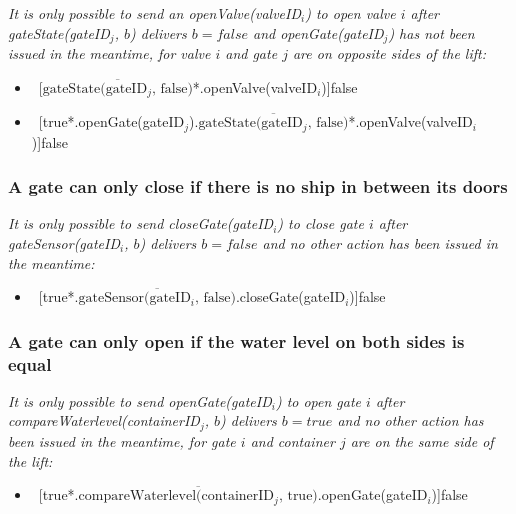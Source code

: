 \textit{It is only possible to send an openValve(valveID$_i$) to open valve $i$ after gateState(gateID$_j$, $ b $) delivers $b = false$ and openGate(gateID$_j$) has not been issued in the meantime, for valve $i$ and gate $j$ are on opposite sides of the lift:}
\begin{itemize}
	\item ~[$\overline{\textrm{gateState(gateID$_j$, false)}}$*.openValve(valveID$_i$)]false
	\item ~[true*.openGate(gateID$_j$).$\overline{\textrm{gateState(gateID$_j$, false)}}$*.openValve(valveID$_i$)]false
\end{itemize}

\subsubsection{A gate can only close if there is no ship in between its doors}
\textit{It is only possible to send closeGate(gateID$_i$) to close gate $i$ after gateSensor(gateID$_i$, $b$) delivers $b = false$ and no other action has been issued in the meantime:}
\begin{itemize}
	\item ~[true*.$\overline{\textrm{gateSensor(gateID$_i$, false)}}$.closeGate(gateID$_i$)]false
\end{itemize}

\subsubsection{A gate can only open if the water level on both sides is equal}
\textit{It is only possible to send openGate(gateID$_i$) to open gate $i$ after \linebreak compareWaterlevel(containerID$_j$, $b$) delivers $b = true$ and no other action has been issued in the meantime, for gate $i$ and container $j$ are on the same side of the lift:}
\begin{itemize}
	\item ~[true*.$\overline{\textrm{compareWaterlevel(containerID$_j$, true)}}$.openGate(gateID$_i$)]false
\end{itemize}

